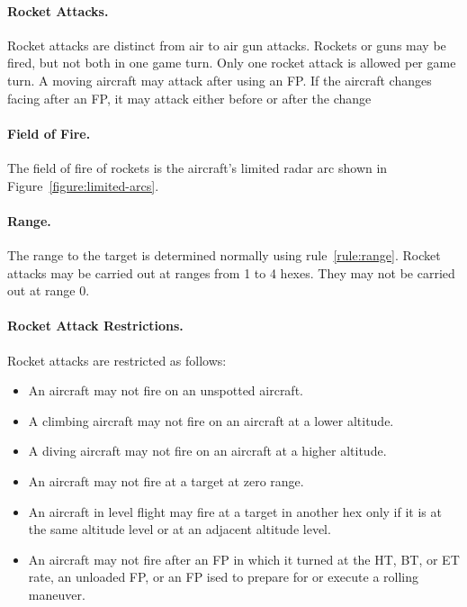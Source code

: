 \begin{advancedrules}
{\paragraph{Rocket Attacks.} Rocket attacks are distinct from air to air gun attacks. Rockets or guns may be fired, but not both in one game turn. Only one rocket attack is allowed per game turn. A moving aircraft may attack after using an FP. If the aircraft changes facing after an FP, it may attack either before or after the change

\paragraph{Field of Fire.} The field of fire of rockets is the aircraft's limited radar arc shown in Figure~\ref{figure:limited-arcs}.

\paragraph{Range.} The range to the target is determined normally using rule~\ref{rule:range}. Rocket attacks may be carried out at ranges from 1 to 4 hexes. They may not be carried out at range 0.

\paragraph{Rocket Attack Restrictions.} Rocket attacks are restricted as follows:

\begin{itemize}

    \item An aircraft may not fire on an unspotted aircraft.

    \item A climbing aircraft may not fire on an aircraft at a lower altitude.

    \item A diving aircraft may not fire on an aircraft at a higher altitude.

    \item An aircraft may not fire at a target at zero range.

    \item An aircraft in level flight may fire at a target in another hex only if it is at the same altitude level or at an adjacent altitude level.

    \item An aircraft may not fire after an FP in which it turned at the HT, BT, or ET rate, an unloaded FP, or an FP ised to prepare for or execute a rolling maneuver.


\end{itemize}}
\end{advancedrules}
